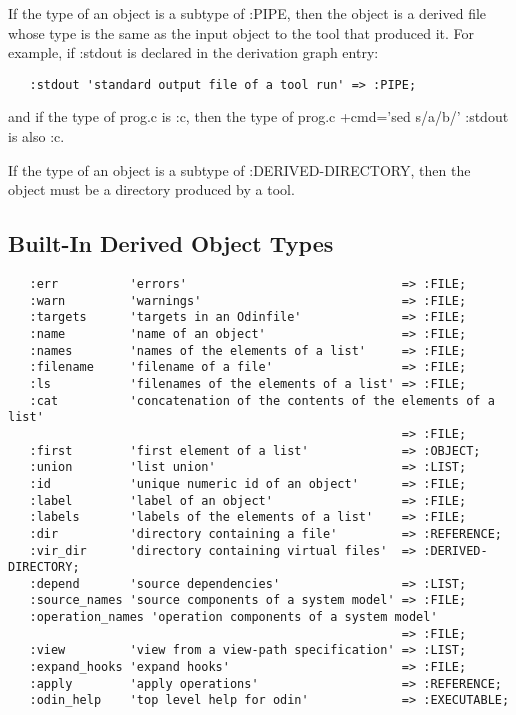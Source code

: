 If the type of an object is a subtype of {\ex :PIPE},
then the object is a derived file whose type is the same
as the input object to the tool that produced it.
For example, if {\ex :stdout} is declared in the derivation graph entry:
\begin{verbatim}
   :stdout 'standard output file of a tool run' => :PIPE;
\end{verbatim}
and if the type of {\ex prog.c} is {\ex :c},
then the type of {\ex prog.c +cmd='sed s/a/b/' :stdout} is also {\ex :c}.

If the type of an object is a subtype of {\ex :DERIVED-DIRECTORY},
then the object must be a directory produced by a tool.

\subsection{Built-In Derived Object Types}
\label{builtindrv}

\begin{verbatim}
   :err          'errors'                              => :FILE;
   :warn         'warnings'                            => :FILE;
   :targets      'targets in an Odinfile'              => :FILE;
   :name         'name of an object'                   => :FILE;
   :names        'names of the elements of a list'     => :FILE;
   :filename     'filename of a file'                  => :FILE;
   :ls           'filenames of the elements of a list' => :FILE;
   :cat          'concatenation of the contents of the elements of a list'
                                                       => :FILE;
   :first        'first element of a list'             => :OBJECT;
   :union        'list union'                          => :LIST;
   :id           'unique numeric id of an object'      => :FILE;
   :label        'label of an object'                  => :FILE;
   :labels       'labels of the elements of a list'    => :FILE;
   :dir          'directory containing a file'         => :REFERENCE;
   :vir_dir      'directory containing virtual files'  => :DERIVED-DIRECTORY;
   :depend       'source dependencies'                 => :LIST;
   :source_names 'source components of a system model' => :FILE;
   :operation_names 'operation components of a system model'
                                                       => :FILE;
   :view         'view from a view-path specification' => :LIST;
   :expand_hooks 'expand hooks'                        => :FILE;
   :apply        'apply operations'                    => :REFERENCE;
   :odin_help    'top level help for odin'             => :EXECUTABLE;
\end{verbatim}

